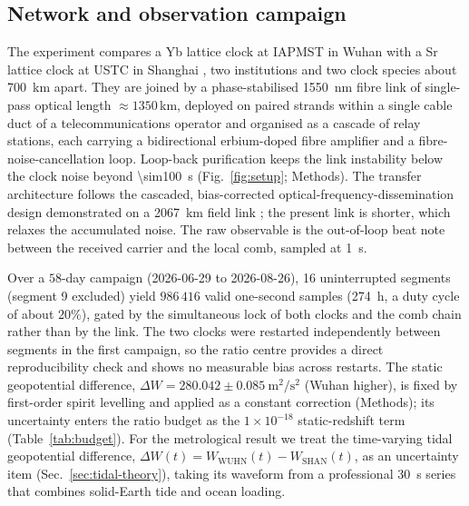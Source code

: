 \documentclass[11pt,a4paper]{article}
\newcommand{\dW}{\Delta W}
\newcommand{\e}[1]{\times 10^{#1}}
\begin{document}
\subsection{Network and observation campaign}
\label{sec:network}

The experiment compares a Yb lattice clock at IAPMST in Wuhan
\citep{zhu2026yb} with a Sr lattice clock at USTC in Shanghai
\citep{jia2026sr}, two institutions and two clock
species about \qty{700}{km} apart. They are joined by a phase-stabilised
\qty{1550}{nm} fibre link of single-pass optical length $\approx1350$\,km,
deployed on paired strands within a single cable duct of a
telecommunications operator and organised as a cascade of relay stations,
each carrying a bidirectional erbium-doped fibre amplifier and a
fibre-noise-cancellation loop. Loop-back purification keeps the link
instability below the clock noise beyond \qty{\sim100}{s}
(Fig.~\ref{fig:setup}; Methods). The transfer architecture follows the
cascaded, bias-corrected optical-frequency-dissemination design
demonstrated on a \qty{2067}{km} field link \citep{chen2026dissemination}; the
present link is shorter, which relaxes the accumulated noise. The raw
observable is the out-of-loop beat note between the received carrier and
the local comb, sampled at \qty{1}{s}.

{\sloppy
Over a $58$-day campaign (2026-06-29 to 2026-08-26), 16 uninterrupted
segments (segment 9 excluded) yield $986\,416$ valid one-second samples
(\qty{274}{h}, a duty cycle of about $20\%$), gated by the simultaneous lock of both clocks
and the comb chain rather than by the link. The two clocks were
restarted independently between segments in the first campaign, so the
ratio centre provides a direct reproducibility check and shows no
measurable bias across restarts. The static geopotential difference,
$\dW = 280.042\pm0.085\ \mathrm{m^{2}/s^{2}}$ (Wuhan higher), is fixed
by first-order spirit levelling and applied as a constant correction
(Methods); its uncertainty enters the ratio budget as the $1\e{-18}$
static-redshift term (Table~\ref{tab:budget}). For the metrological
result we treat the time-varying tidal geopotential difference,
$\dW(t) = W_{\mathrm{WUHN}}(t) - W_{\mathrm{SHAN}}(t)$, as an
uncertainty item (Sec.~\ref{sec:tidal-theory}), taking its waveform
from a professional \qty{30}{s} series that combines solid-Earth tide and
ocean loading.
\par}
\end{document}
